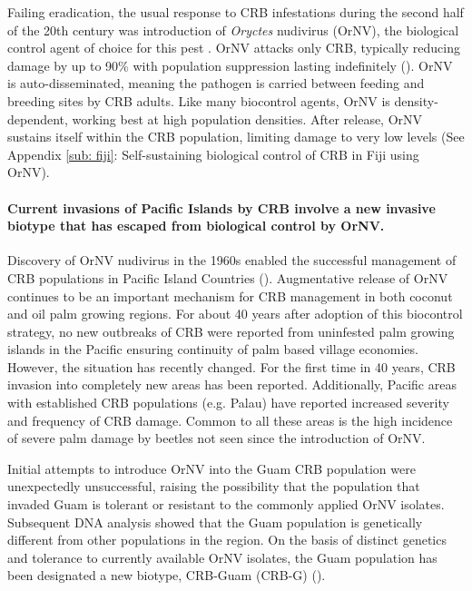 \documentclass[12pt,letterpaper,english,bibliography=totocnumbered, abstract=on]{scrartcl}
\begin{document}
Failing eradication, the usual response to CRB infestations during
the second half of the 20th century was introduction of \emph{Oryctes}
nudivirus (OrNV), the biological control agent of choice for this
pest \cite{jackson_use_2009-1} . OrNV attacks only CRB, typically
reducing damage by up to 90\% with population suppression lasting
indefinitely (\cite{bedford_g._o._long-term_2013}). OrNV is auto-disseminated,
meaning the pathogen is carried between feeding and breeding sites
by CRB adults. Like many biocontrol agents, OrNV is density-dependent,
working best at high population densities. After release, OrNV sustains itself within the 
CRB population, limiting damage to very low levels (See Appendix \ref{sub: fiji}: Self-sustaining biological control of CRB in Fiji using OrNV). 

\paragraph*{Current invasions of Pacific Islands by CRB involve a new invasive
biotype that has escaped from biological control by OrNV. }

Discovery of OrNV nudivirus in the 1960s enabled the successful management
of CRB populations in Pacific Island Countries (\cite{huger_oryctes_2005-1}).
Augmentative release of OrNV continues to be an important mechanism
for CRB management in both coconut and oil palm growing regions. For
about 40 years after adoption of this biocontrol strategy,
no new outbreaks of CRB were reported from uninfested palm growing
islands in the Pacific ensuring continuity of palm based village economies. 
However, the situation has recently changed. For the first time in
40 years, CRB invasion into completely new areas has been reported.
Additionally, Pacific areas with established CRB populations (e.g.
Palau) have reported increased severity and frequency of CRB damage.
Common to all these areas is the high incidence of severe palm damage
by beetles not seen since the introduction of OrNV. 

Initial attempts to introduce OrNV into the Guam CRB population were
unexpectedly unsuccessful, raising the possibility that the population
that invaded Guam is tolerant or resistant to the commonly applied
OrNV isolates. Subsequent DNA analysis showed that the Guam population
is genetically different from other populations in the region. On
the basis of distinct genetics and tolerance to currently available
OrNV isolates, the Guam population has been designated a new biotype,
CRB-Guam (CRB-G) (\cite{marshall_new_2015,marshall_new_2017-1}).
\end{document}
